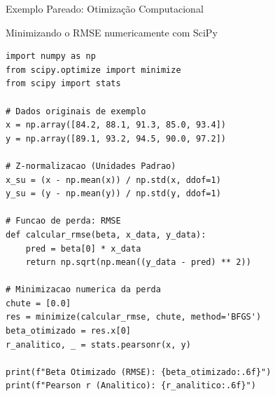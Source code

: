\begin{frame}[fragile]{Exemplo Pareado: Otimização Computacional}
    \begin{block}{Minimizando o RMSE numericamente com SciPy}
\begin{lstlisting}
import numpy as np
from scipy.optimize import minimize
from scipy import stats

# Dados originais de exemplo
x = np.array([84.2, 88.1, 91.3, 85.0, 93.4])
y = np.array([89.1, 93.2, 94.5, 90.0, 97.2])

# Z-normalizacao (Unidades Padrao)
x_su = (x - np.mean(x)) / np.std(x, ddof=1)
y_su = (y - np.mean(y)) / np.std(y, ddof=1)

# Funcao de perda: RMSE
def calcular_rmse(beta, x_data, y_data):
    pred = beta[0] * x_data
    return np.sqrt(np.mean((y_data - pred) ** 2))

# Minimizacao numerica da perda
chute = [0.0]
res = minimize(calcular_rmse, chute, method='BFGS')
beta_otimizado = res.x[0]
r_analitico, _ = stats.pearsonr(x, y)

print(f"Beta Otimizado (RMSE): {beta_otimizado:.6f}")
print(f"Pearson r (Analitico): {r_analitico:.6f}")
\end{lstlisting}
    \end{block}
\end{frame}
